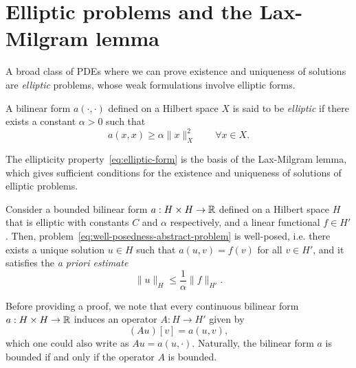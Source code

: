 \section{Elliptic problems and the Lax-Milgram lemma}
A broad class of PDEs where we can prove existence and uniqueness of solutions are \emph{elliptic} problems, whose weak formulations involve elliptic forms. 
\begin{definition}\label{def:elliptic-form}
    A bilinear form $a(\cdot, \cdot)$ defined on a Hilbert space $X$ is said to be \emph{elliptic} if there exists a constant $\alpha>0$ such that
    \begin{equation}\label{eq:elliptic-form}
        a(x, x) \geq \alpha \| x \|^2_X \qquad \forall x\in X.
    \end{equation}
\end{definition}

The ellipticity property~\eqref{eq:elliptic-form} is the basis of the Lax-Milgram lemma, which gives sufficient conditions for the existence and uniqueness of solutions of elliptic problems.
\begin{lemma}\label{lemma:lax-milgram}
    Consider a bounded bilinear form $a: H\times H\to \mathbb{R}$ defined on a Hilbert space $H$ that is elliptic with constants $C$ and $\alpha$ respectively, and a linear functional $f\in H'$. Then, problem~\eqref{eq:well-posedness-abstract-problem} is well-posed, i.e. there exists a unique solution $u\in H$ such that $a(u,v)=f(v)$ for all $v\in H'$, and it satisfies the \emph{a priori estimate}
    \begin{equation}\label{eq:lax-milgram-a-priori}
        \| u\|_H \leq \frac 1 \alpha \| f \|_{H'} .
    \end{equation}
\end{lemma}

Before providing a proof, we note that every continuous bilinear form $a:H\times H\to \mathbb{R}$ induces an operator $A:H\to H'$ given by
\begin{equation}\label{eq:form-induced-by-matrix}
    (Au)[v] = a(u,v),
\end{equation}
which one could also write as $Au = a(u, \cdot)$. Naturally, the bilinear form $a$ is bounded if and only if the operator $A$ is bounded. 

